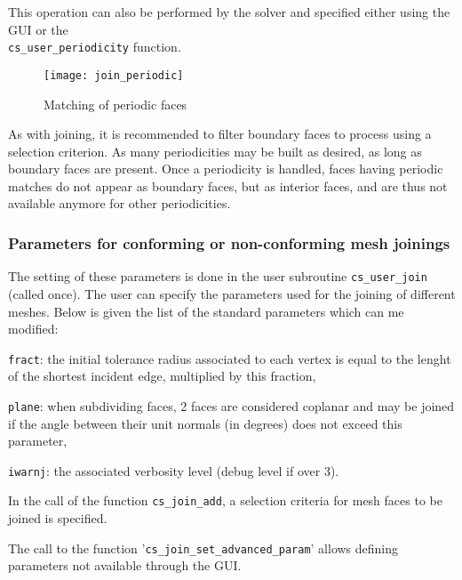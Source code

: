 {{{This operation can also be performed by the solver and specified
either using the GUI or the \\\texttt{cs\_user\_periodicity} function.

\begin{figure}[!hp]
\centerline{
\texttt{[image: join\_periodic]}}
\caption{Matching of periodic faces
\label{fig_join_periodic}}
\end{figure}

As with joining, it is recommended to filter boundary faces to process
using a selection criterion. As many periodicities may be built as desired,
as long as boundary faces are present. Once a periodicity is handled,
faces having periodic matches do not appear as boundary faces, but as
interior faces, and are thus not available anymore for other
periodicities.

\subsubsection{Parameters for conforming or non-conforming mesh joinings}

The setting of these parameters is done in the user subroutine \texttt{cs\_user\_join} (called once). The user can specify the parameters used for the joining of different meshes. Below is given the list of the standard parameters which can me modified:
\begin{list}{-}{}
\item \texttt{fract}: the initial tolerance radius associated to each vertex is equal to the lenght of the shortest incident edge, multiplied by this fraction,
\item \texttt{plane}: when subdividing faces, 2 faces are considered coplanar and may be joined if the angle between their unit normals (in degrees) does not exceed this parameter,
\item \texttt{iwarnj}: the associated verbosity level (debug level if over 3).
\end{list}
In the call of the function \texttt{cs\_join\_add}, a selection criteria for
mesh faces to be joined is specified.

The call to the function '\texttt{cs\_join\_set\_advanced\_param}' allows defining parameters not available through the GUI.

}}}
